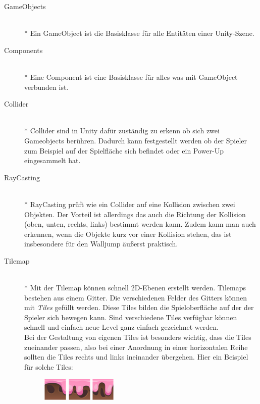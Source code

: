 \begin{description}
    \item[GameObjects] \hfill \\* Ein GameObject ist die Basisklasse für alle Entitäten einer Unity-Szene.
    \item[Components] \hfill \\* Eine Component ist eine Basisklasse für alles was mit GameObject verbunden ist.
    \item[Collider] \hfill \\* Collider sind in Unity dafür zuständig zu erkenn ob sich zwei Gameobjects berühren. Dadurch kann festgestellt werden ob der Spieler zum Beispiel auf der Spielfläche sich befindet oder ein Power-Up eingesammelt hat.
    \item[RayCasting] \hfill \\*
        RayCasting prüft wie ein Collider auf eine Kollision zwischen zwei Objekten. Der Vorteil ist allerdings das auch die Richtung der Kollision (oben, unten, rechts, links) bestimmt werden kann. Zudem kann man auch erkennen, wenn die Objekte kurz vor einer Kollision stehen, das ist insbesondere für den Walljump äußerst praktisch.
    \item[Tilemap] \hfill \\* Mit der Tilemap können schnell 2D-Ebenen erstellt werden. Tilemaps bestehen aus einem Gitter. Die verschiedenen Felder des Gitters können mit \textit{Tiles} gefüllt werden. Diese Tiles bilden die Spieloberfläche auf der der Spieler sich bewegen kann. Sind verschiedene Tiles verfügbar können schnell und einfach neue Level ganz einfach gezeichnet werden. \\ 
        Bei der Gestaltung von eigenen Tiles ist besonders wichtig, dass die Tiles zueinander passen, also bei einer Anordnung in einer horizontalen Reihe sollten die Tiles rechts und links ineinander übergehen. Hier ein Beispiel für solche Tiles: 
        \begin{figure}[H]
            \begin{center}
              \includegraphics{img/realisierung/tile1.png}
              \includegraphics{img/realisierung/tile2.png}
              \includegraphics{img/realisierung/tile3.png}
              \label{fig:realisierung:realisierung:tiles}
            \end{center}
        \end{figure}
        

\end{description}
